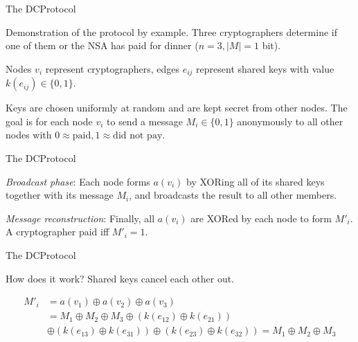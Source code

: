 \documentclass[]{beamer} %
\begin{document}
\begin{frame}{The \acl{DCProtocol}}

Demonstration of the protocol by example. Three cryptographers determine
if one of them or the NSA has paid for dinner ($n = 3, |M| = 1$ bit).

Nodes $v_i$ represent cryptographers, edges $e_{ij}$ represent shared keys
with value $k(e_{ij}) \in \{0, 1\}$.

Keys are chosen uniformly at random and are kept secret from other nodes.
The goal is for each node $v_i$ to send a message $M_i \in \{0, 1\}$
anonymously to all other nodes with $0 \approx \text{paid}, 1 \approx \text{did not pay}$.

\end{frame}


\begin{frame}{The \acl{DCProtocol}}

\emph{Broadcast phase}: Each node forms $a(v_i)$ by XORing all of its shared keys
together with its message $M_i$, and broadcasts the result to all other members.

\emph{Message reconstruction}: Finally, all $a(v_i)$ are XORed by each node to form $M'_i$.
A cryptographer paid iff $M'_i = 1$.
\end{frame}

\begin{frame}{The \acl{DCProtocol}}

How does it work? Shared keys cancel each other out. 

\begin{align*}
M'_i &= a(v_1) \oplus a(v_2) \oplus a(v_3) \\
     &= M_1 \oplus M_2 \oplus M_3
     \oplus (k(e_{12}) \oplus k(e_{21})) \\
     & \oplus (k(e_{13}) \oplus k(e_{31})) 
     \oplus (k(e_{23}) \oplus k(e_{32})) = M_1 \oplus M_2 \oplus M_3
\end{align*}

\end{frame}
\end{document}

